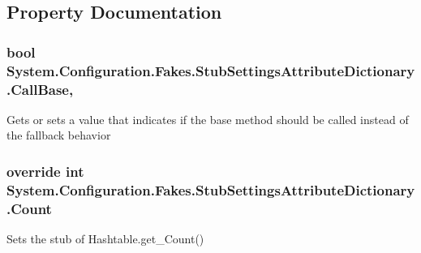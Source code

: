 \subsection{Property Documentation}
\hypertarget{class_system_1_1_configuration_1_1_fakes_1_1_stub_settings_attribute_dictionary_a98d4961df515f5cadff0321ebbda67d4}{
\subsubsection[{Call\-Base}]{\setlength{\rightskip}{0pt plus 5cm}bool System.\-Configuration.\-Fakes.\-Stub\-Settings\-Attribute\-Dictionary.\-Call\-Base\hspace{0.3cm}{\ttfamily [get]}, {\ttfamily [set]}}}\label{class_system_1_1_configuration_1_1_fakes_1_1_stub_settings_attribute_dictionary_a98d4961df515f5cadff0321ebbda67d4}


Gets or sets a value that indicates if the base method should be called instead of the fallback behavior

\hypertarget{class_system_1_1_configuration_1_1_fakes_1_1_stub_settings_attribute_dictionary_a04b0cc85b3fb9650db2536016b9b98c5}{
\subsubsection[{Count}]{\setlength{\rightskip}{0pt plus 5cm}override int System.\-Configuration.\-Fakes.\-Stub\-Settings\-Attribute\-Dictionary.\-Count\hspace{0.3cm}{\ttfamily [get]}}}\label{class_system_1_1_configuration_1_1_fakes_1_1_stub_settings_attribute_dictionary_a04b0cc85b3fb9650db2536016b9b98c5}


Sets the stub of Hashtable.\-get\-\_\-\-Count()

